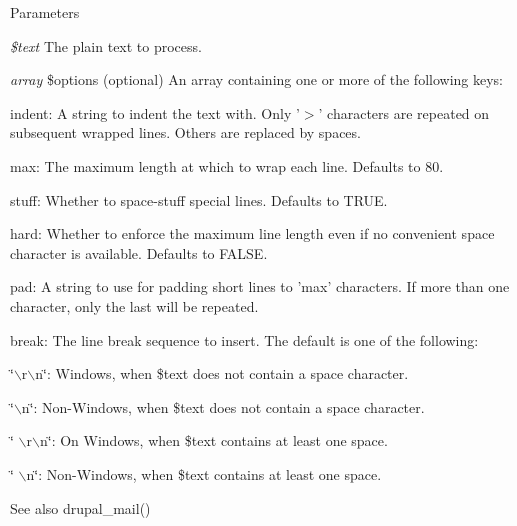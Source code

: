 \begin{DoxyParams}{Parameters}
\item[{\em \$text}]The plain text to process. \item[{\em array}]\$options (optional) An array containing one or more of the following keys:
\begin{DoxyItemize}
\item indent: A string to indent the text with. Only '$>$' characters are repeated on subsequent wrapped lines. Others are replaced by spaces.
\item max: The maximum length at which to wrap each line. Defaults to 80.
\item stuff: Whether to space-\/stuff special lines. Defaults to TRUE.
\item hard: Whether to enforce the maximum line length even if no convenient space character is available. Defaults to FALSE.
\item pad: A string to use for padding short lines to 'max' characters. If more than one character, only the last will be repeated.
\item break: The line break sequence to insert. The default is one of the following:
\begin{DoxyItemize}
\item \char`\"{}$\backslash$r$\backslash$n\char`\"{}: Windows, when \$text does not contain a space character.
\item \char`\"{}$\backslash$n\char`\"{}: Non-\/Windows, when \$text does not contain a space character.
\item \char`\"{} $\backslash$r$\backslash$n\char`\"{}: On Windows, when \$text contains at least one space.
\item \char`\"{} $\backslash$n\char`\"{}: Non-\/Windows, when \$text contains at least one space.
\end{DoxyItemize}
\end{DoxyItemize}\end{DoxyParams}
\begin{DoxySeeAlso}{See also}
drupal\_\-mail() 
\end{DoxySeeAlso}
